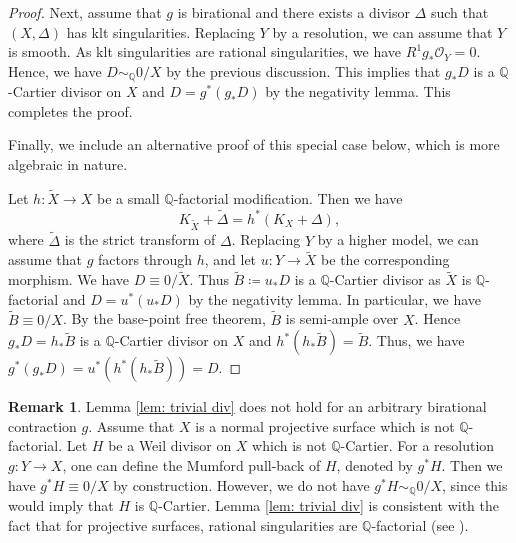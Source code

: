 \documentclass[11pt,oneside,reqno]{amsart}
\numberwithin{equation}{section}
\theoremstyle{definition}
\newtheorem{remark}[proposition]{Remark}
\newcommand{\bQ}{\mathbb{Q}}
\newcommand{\mO}{\mathcal{O}}
\begin{document}
\begin{proof}
Next, assume that $g$ is birational and there exists a divisor $\Delta$ such that $(X, \Delta)$ has klt singularities. Replacing $Y$ by a resolution, we can assume that $Y$ is smooth. As klt singularities are rational singularities, we have $R^1g_*\mO_Y=0$. Hence, we have $D \sim_\bQ 0/X$ by the previous discussion. This implies that $g_*D$ is a $\bQ$-Cartier divisor on $X$ and $D=g^*(g_*D)$ by the negativity lemma. This completes the proof.

Finally, we include an alternative proof of this special case below, which is more algebraic in nature.

Let $h: \tilde X \to X$ be a small $\bQ$-factorial modification. Then we have
    \[
    K_{\tilde X}+\tilde \Delta=h^*(K_X+\Delta),
    \] where $\tilde \Delta$ is the strict transform of $\Delta$. Replacing $Y$ by a higher model, we can assume that $g$ factors through $h$, and let $u: Y \to \tilde X$ be the corresponding morphism. We have $D \equiv 0/\tilde X$. Thus $\tilde B \coloneqq u_*D$ is a $\bQ$-Cartier divisor as $\tilde X$ is $\bQ$-factorial and $D =u^*(u_*D)$ by the negativity lemma. In particular, we have $\tilde B\equiv 0/X$. By the base-point free theorem, $\tilde B$ is semi-ample over $X$. Hence $g_*D=h_*\tilde B$ is a $\bQ$-Cartier divisor on $X$ and $h^*(h_*\tilde B)=\tilde B$. Thus, we have $g^*(g_*D)=u^*(h^*(h_*\tilde B))=D$.
\end{proof}

\begin{remark}
    Lemma \ref{lem: trivial div} does not hold for an arbitrary birational contraction $g$. Assume that $X$ is a normal projective surface which is not $\bQ$-factorial. Let $H$ be a Weil divisor on $X$ which is not $\bQ$-Cartier. For a resolution $g: Y \to X$, one can define the Mumford pull-back of $H$, denoted by $g^*H$. Then we have $g^*H \equiv 0/X$ by construction. However, we do not have $g^*H \sim_{\bQ} 0/X$, since this would imply that $H$ is $\bQ$-Cartier. Lemma \ref{lem: trivial div} is consistent with the fact that for projective surfaces, rational singularities are $\mathbb{Q}$-factorial (see \cite[Theorem 4.6]{Bad01}).
\end{remark}
\end{document}

